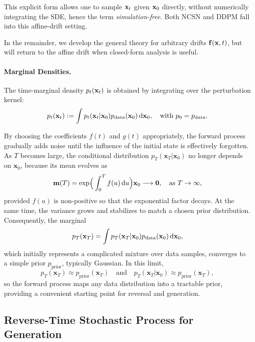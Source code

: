This explicit form allows one to sample ${\mathbf{x}}_t$ given ${\mathbf{x}}_0$ directly, without numerically integrating the SDE, hence the term \emph{simulation-free}. Both NCSN and DDPM fall into this affine-drift setting. 

In the remainder, we develop the general theory for arbitrary drifts ${\mathbf{f}}({\mathbf{x}},t)$, but will return to the affine drift when closed-form analysis is useful.



\paragraph{Marginal Densities.} 
The time-marginal density $ p_t({\mathbf{x}}_t) $ is obtained by integrating over the perturbation kernel:
\begin{equation}\label{eq:scoresde-oracle-marginal}
    p_t({\mathbf{x}}_t) := \int p_t({\mathbf{x}}_t|{\mathbf{x}}_0) p_{\mathrm{data}}({\mathbf{x}}_0) \mathop{}\!\mathrm{d} {\mathbf{x}}_0, \quad \text{with } p_0 = p_{\mathrm{data}}.
\end{equation}

{By choosing the coefficients $f(t)$ and $g(t)$ appropriately, the forward process gradually adds noise until the influence of the initial state is effectively forgotten. As $T$ becomes large, the conditional distribution $p_T(\mathbf{x}_T |\mathbf{x}_0)$ no longer depends on $\mathbf{x}_0$, because its mean evolves as
\[
{\mathbf{m}}(T) = \exp\!\Big(\int_0^T f(u)\mathop{}\!\mathrm{d} u\Big) \mathbf{x}_0  \longrightarrow  \mathbf{0}, \quad \text{as } T\to\infty,
\]
provided $f(u)$ is non-positive so that the exponential factor decays. At the same time, the variance grows and stabilizes to match a chosen prior distribution.} Consequently, the marginal
\[
p_T(\mathbf{x}_T) = \int p_T(\mathbf{x}_T |\mathbf{x}_0) p_{\mathrm{data}}(\mathbf{x}_0)\mathop{}\!\mathrm{d}\mathbf{x}_0,
\]
which initially represents a complicated mixture over data samples, converges to a simple prior $p_{\mathrm{prior}}$, typically Gaussian. In this limit,
\[
p_T(\mathbf{x}_T) \approx p_{\mathrm{prior}}(\mathbf{x}_T) 
\quad \text{and} \quad 
p_T(\mathbf{x}_T |\mathbf{x}_0) \approx p_{\mathrm{prior}}(\mathbf{x}_T),
\]
so the forward process maps any data distribution into a tractable prior, providing a convenient starting point for reversal and generation.







\subsection{Reverse-Time Stochastic Process for Generation}\label{subsec:reverse-sde}



